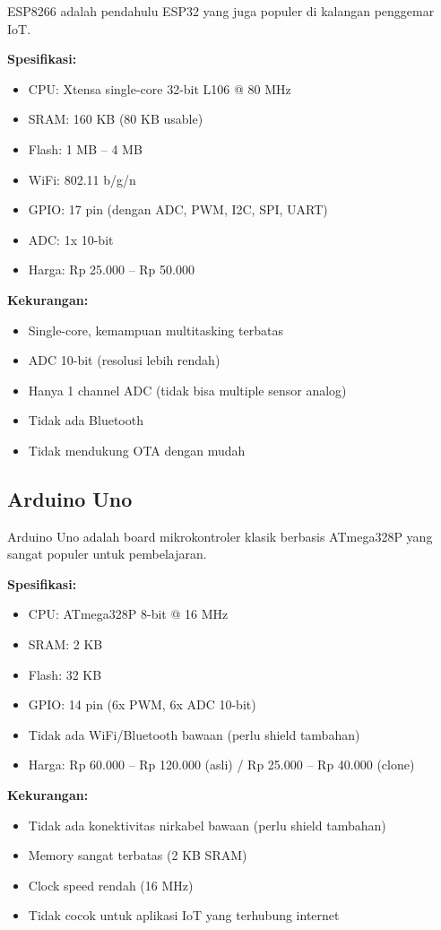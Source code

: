 \documentclass[12pt,a4paper,oneside]{report}
\begin{document}
ESP8266 adalah pendahulu ESP32 yang juga populer di kalangan penggemar IoT.

\textbf{Spesifikasi:}
\begin{itemize}
    \item CPU: Xtensa single-core 32-bit L106 @ 80 MHz
    \item SRAM: 160 KB (80 KB usable)
    \item Flash: 1 MB -- 4 MB
    \item WiFi: 802.11 b/g/n
    \item GPIO: 17 pin (dengan ADC, PWM, I2C, SPI, UART)
    \item ADC: 1x 10-bit
    \item Harga: Rp 25.000 -- Rp 50.000
\end{itemize}

\textbf{Kekurangan:}
\begin{itemize}
    \item Single-core, kemampuan multitasking terbatas
    \item ADC 10-bit (resolusi lebih rendah)
    \item Hanya 1 channel ADC (tidak bisa multiple sensor analog)
    \item Tidak ada Bluetooth
    \item Tidak mendukung OTA dengan mudah
\end{itemize}

\subsection{Arduino Uno}

Arduino Uno adalah board mikrokontroler klasik berbasis ATmega328P yang sangat populer untuk pembelajaran.

\textbf{Spesifikasi:}
\begin{itemize}
    \item CPU: ATmega328P 8-bit @ 16 MHz
    \item SRAM: 2 KB
    \item Flash: 32 KB
    \item GPIO: 14 pin (6x PWM, 6x ADC 10-bit)
    \item Tidak ada WiFi/Bluetooth bawaan (perlu shield tambahan)
    \item Harga: Rp 60.000 -- Rp 120.000 (asli) / Rp 25.000 -- Rp 40.000 (clone)
\end{itemize}

\textbf{Kekurangan:}
\begin{itemize}
    \item Tidak ada konektivitas nirkabel bawaan (perlu shield tambahan)
    \item Memory sangat terbatas (2 KB SRAM)
    \item Clock speed rendah (16 MHz)
    \item Tidak cocok untuk aplikasi IoT yang terhubung internet
\end{itemize}
\end{document}
